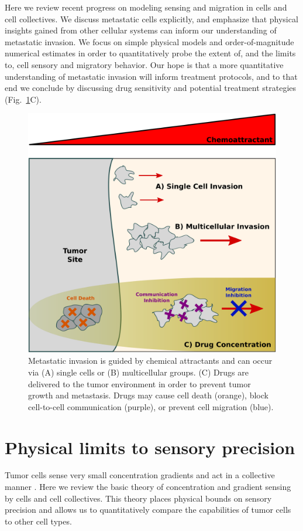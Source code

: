 Here we review recent progress on modeling sensing and migration in cells and cell collectives. We discuss metastatic cells explicitly, and emphasize that physical insights gained from other cellular systems can inform our understanding of metastatic invasion. We focus on simple physical models and order-of-magnitude numerical estimates in order to quantitatively probe the extent of, and the limits to, cell sensory and migratory behavior. Our hope is that a more quantitative understanding of metastatic invasion will inform treatment protocols, and to that end we conclude by discussing drug sensitivity and potential treatment strategies (Fig.\ \ref{overview}C).



\begin{figure}[tb]
    \centering
        \includegraphics[width=0.8\columnwidth]{../fig/ch1_fig1.pdf}
    \caption{Metastatic invasion is guided by chemical attractants and can occur via (A) single cells or (B) multicellular groups. (C) Drugs are delivered to the tumor environment in order to prevent tumor growth and metastasis. Drugs may cause cell death (orange), block cell-to-cell communication (purple), or prevent cell migration (blue).}
\label{overview}
\end{figure}



\section{Physical limits to sensory precision}

Tumor cells sense very small concentration gradients \cite{shields2007autologous} and act in a collective manner \cite{cheung2013collective, friedl2012classifying, aceto2014circulating, puliafito2015three}. Here we review the basic theory of concentration and gradient sensing by cells and cell collectives. This theory places physical bounds on sensory precision and allows us to quantitatively compare the capabilities of tumor cells to other cell types.

